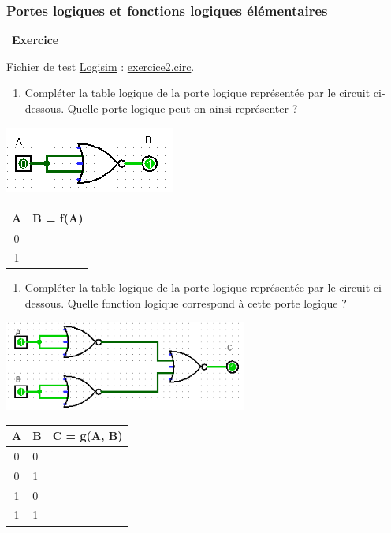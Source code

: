 \documentclass[
  11pt,
]{article}
\providecommand{\tightlist}{%
  \setlength{\itemsep}{0pt}\setlength{\parskip}{0pt}}
\newcounter{exo}
\newenvironment{exercice}[1]
{\par \medskip   \addtocounter{exo}{1} \noindent  
\begin{bclogo}[arrondi =0.1,   noborder = true, logo=\bccrayon, marge=4]{~\textbf{Exercice} \textbf{\theexo} {\itshape #1} }  \par}
{
\end{bclogo}
 \par \bigskip }
\newcounter{def}
\newcounter{logi}
\begin{document}
\hypertarget{portes-logiques-et-fonctions-logiques-uxe9luxe9mentaires}{%
\subsubsection{Portes logiques et fonctions logiques
élémentaires}\label{portes-logiques-et-fonctions-logiques-uxe9luxe9mentaires}}

\begin{exercice}{}

Fichier de test \href{http://www.cburch.com/logisim/}{Logisim} :
\href{circuits_logisim/exercice2.circ}{exercice2.circ}.

\begin{enumerate}
\def\labelenumi{\arabic{enumi}.}
\tightlist
\item
  Compléter la table logique de la porte logique représentée par le
  circuit ci-dessous. Quelle porte logique peut-on ainsi représenter ?
\end{enumerate}

\includegraphics{images/porte_not_with_nor.png}\\

\begin{longtable}[]{@{}cl@{}}
\toprule
A & B = f(A)\tabularnewline
\midrule
\endhead
0 &\tabularnewline
1 &\tabularnewline
\bottomrule
\end{longtable}

\begin{enumerate}
\def\labelenumi{\arabic{enumi}.}
\setcounter{enumi}{1}
\tightlist
\item
  Compléter la table logique de la porte logique représentée par le
  circuit ci-dessous. Quelle fonction logique correspond à cette porte
  logique ?
\end{enumerate}

\includegraphics[width=0.6\textwidth,height=\textheight]{images/porte_and_with_nor.png}\\

\begin{longtable}[]{@{}cll@{}}
\toprule
A & B & C = g(A, B)\tabularnewline
\midrule
\endhead
0 & 0 &\tabularnewline
0 & 1 &\tabularnewline
1 & 0 &\tabularnewline
1 & 1 &\tabularnewline
\bottomrule
\end{longtable}

\end{exercice}
\end{document}
